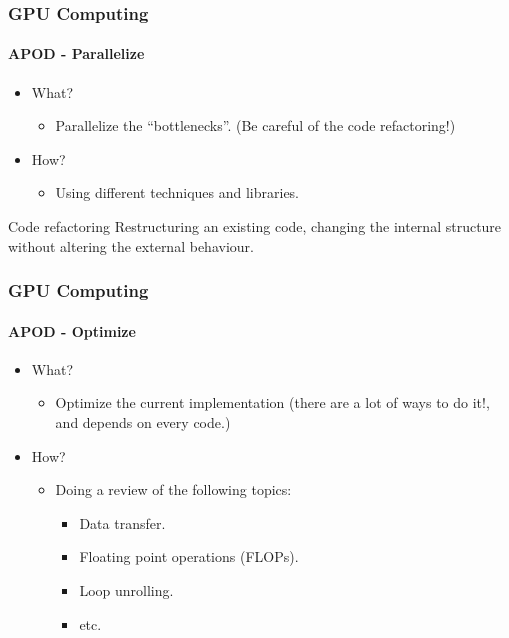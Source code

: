 \begin{frame}
    \frametitle{GPU Computing}
    \framesubtitle{APOD - Parallelize}
    \begin{itemize}
        \item What?
        \begin{itemize}
            \item Parallelize the ``bottlenecks''.
                (Be careful of the code refactoring!)
        \end{itemize}
        \item How?
        \begin{itemize}
            \item Using different techniques and libraries.
        \end{itemize}
    \end{itemize}
        \begin{block}{Code refactoring}
            Restructuring an existing code, changing the internal structure without
            altering the external behaviour.
        \end{block}
\end{frame}

\begin{frame}
    \frametitle{GPU Computing}
    \framesubtitle{APOD - Optimize}
    \begin{itemize}
        \item What?
        \begin{itemize}
            \item Optimize the current implementation (there are a lot of ways to do it!, and depends on every code.)
        \end{itemize}
        \item How?
        \begin{itemize}
            \item Doing a review of the following topics:
            \begin{itemize}
                \item Data transfer.
                \item Floating point operations (FLOPs).
                \item Loop unrolling.
                \item etc.
            \end{itemize}
        \end{itemize}
    \end{itemize}
\end{frame}

